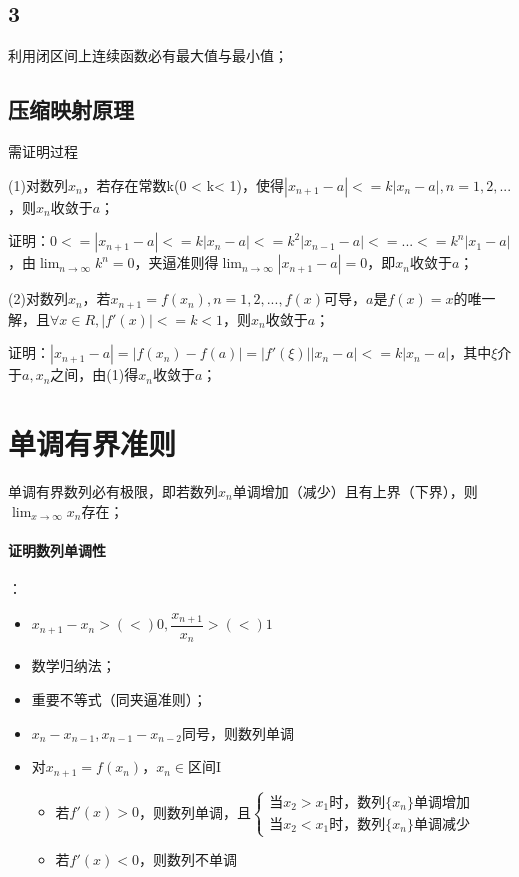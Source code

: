 \subsection{3}
利用闭区间上连续函数必有最大值与最小值；


\subsection{压缩映射原理}
需证明过程

(1)对数列{\(x_n\)}，若存在常数k(0 < k< 1)，使得\(|x_{n + 1} - a| <= k|x_n - a|, n = 1, 2, ...\)，则{\(x_n\)}收敛于\(a\)；

证明：\(0 <= |x_{n + 1} - a| <= k|x_n - a| <= k^2|x_{n - 1} - a| <= ... <= k^n|x_1 - a|\)，由\(\displaystyle \lim_{n \to \infty}k^n = 0\)，夹逼准则得\(\displaystyle \lim_{n \to \infty}|x_{n + 1} - a| = 0\)，即{\(x_n\)}收敛于\(a\)；

(2)对数列{\(x_n\)}，若\(x_{n + 1} = f(x_n), n = 1, 2, ..., f(x)\)可导，\(a\)是\(f(x) = x\)的唯一解，且\(\forall x \in R, |f'(x)| <= k < 1\)，则{\(x_n\)}收敛于\(a\)；

证明：\(|x_{n + 1} - a| = |f(x_n) - f(a)| = |f'(\xi)||x_n - a| <= k|x_n - a|\)，其中\(\xi\)介于\(a, x_n\)之间，由(1)得{\(x_n\)}收敛于\(a\)；


\section{单调有界准则}
单调有界数列必有极限，即若数列{\(x_n\)}单调增加（减少）且有上界（下界），则\(\displaystyle \lim_{x \to \infty}x_n\)存在；

\paragraph{证明数列单调性}
：\begin{itemize}
    \item \(x_{n + 1} - x_n >(<) 0, \dfrac{x_{n + 1}}{x_n} >(<) 1\)
    \item 数学归纳法；
    \item 重要不等式（同夹逼准则）；
    \item \(x_n - x_{n - 1}, x_{n - 1} - x_{n - 2}\)同号，则数列单调
    \item 对\(x_{n + 1} = f(x_n)\)，\(x_n \in\)区间I\begin{itemize}
        \item 若\(f'(x) > 0\)，则数列单调，且\(\begin{cases}
        \text{当}x_2 > x_1\text{时，数列}\{x_n\}\text{单调增加} \\ 
        \text{当}x_2 < x_1\text{时，数列}\{x_n\}\text{单调减少}
        \end{cases}\)
        \item 若\(f'(x) < 0\)，则数列不单调
    \end{itemize}
\end{itemize}





